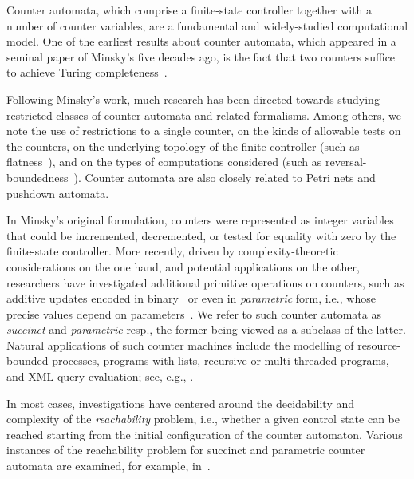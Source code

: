 Counter automata, which comprise a finite-state controller together
with a number of counter variables, are a fundamental and widely-studied
computational model. One of the earliest results about counter
automata, which appeared in a seminal paper of Minsky's five decades
ago, is the fact that two counters suffice to achieve Turing
completeness~\cite{Min61}.

Following Minsky's work, much research has been directed towards
studying restricted classes of counter automata and related
formalisms. Among others, we note the use of restrictions to a single
counter, on the kinds of allowable tests on the counters, on the
underlying topology of the finite controller (such as
flatness~\cite{CJ98-cav,LS08-atva}), and on the types of computations
considered (such as reversal-boundedness~\cite{ID06-tcs}). Counter
automata are also closely related to Petri nets and pushdown automata.

In Minsky's original formulation, counters were represented as integer
variables that could be incremented, decremented, or tested for
equality with zero by the finite-state controller. More recently,
driven by complexity-theoretic considerations on the one hand, and
potential applications on the other, researchers have investigated
additional primitive operations on counters, such as additive updates
encoded in binary~\cite{BHIMV06,LS08-atva} or even
in \emph{parametric} form, i.e., whose precise values depend on
parameters~\cite{BIL06-icalp,IJTW93-icalp}. We refer to such counter automata as
\emph{succinct} and \emph{parametric} resp., the former being
viewed as a subclass of the latter. Natural applications of such
counter machines include the modelling of resource-bounded processes,
programs with lists, recursive or multi-threaded programs, and XML
query evaluation; see, e.g.,
\cite{BHIMV06,CR04,ID06-tcs}.

In most cases, investigations have centered around the decidability
and complexity of the \emph{reachability} problem, i.e., whether a
given control state can be reached starting from the initial
configuration of the counter automaton. Various instances of the
reachability problem for succinct and parametric counter automata are
examined, for example, in~\cite{DG-jlc09,HKOW10,IJTW93-icalp}.

